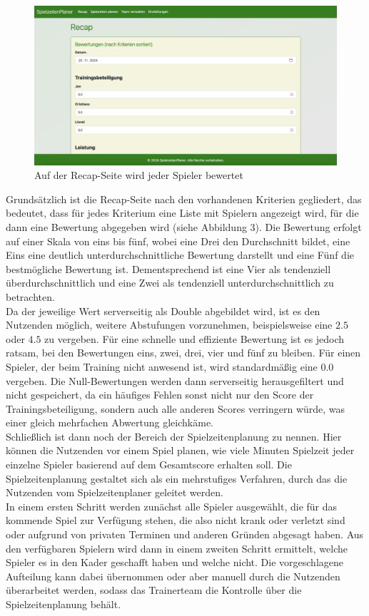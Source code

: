 \begin{figure}[h]
  \centering
  \includegraphics[width=\textwidth]{screenshots/recap.png}
  \caption{Auf der Recap-Seite wird jeder Spieler bewertet}
  \label{fig:recap}
\end{figure}

Grundsätzlich ist die Recap-Seite nach den vorhandenen Kriterien 
gegliedert, das bedeutet, dass für jedes Kriterium eine Liste mit Spielern 
angezeigt wird, für die dann eine Bewertung abgegeben wird (siehe Abbildung 3). Die 
Bewertung erfolgt auf einer Skala von eins bis fünf, wobei eine Drei den Durchschnitt 
bildet, eine Eins eine deutlich unterdurchschnittliche Bewertung darstellt und eine Fünf 
die bestmögliche Bewertung ist. Dementsprechend ist eine Vier als tendenziell 
überdurchschnittlich und eine Zwei als tendenziell unterdurchschnittlich zu 
betrachten. \\ 
Da der jeweilige Wert serverseitig als Double abgebildet wird, ist es den Nutzenden 
möglich, weitere Abstufungen vorzunehmen, beispielsweise eine $ 2.5 $ oder 
$ 4.5 $ zu vergeben. Für eine schnelle und effiziente Bewertung ist es jedoch 
ratsam, bei den Bewertungen eins, zwei, drei, vier und fünf zu bleiben. Für einen 
Spieler, der beim Training nicht anwesend ist, wird standardmäßig eine $ 0.0 $ 
vergeben. Die Null-Bewertungen werden dann serverseitig herausgefiltert und 
nicht gespeichert, da ein häufiges Fehlen sonst nicht nur den Score der 
Trainingsbeteiligung, sondern auch alle anderen Scores verringern würde, was einer 
gleich mehrfachen Abwertung gleichkäme. \\ 
Schließlich ist dann noch der Bereich der Spielzeitenplanung zu nennen. Hier können 
die Nutzenden vor einem Spiel planen, wie viele Minuten Spielzeit jeder einzelne 
Spieler basierend auf dem Gesamtscore erhalten soll. Die Spielzeitenplanung 
gestaltet sich als ein mehrstufiges Verfahren, durch das die Nutzenden vom 
Spielzeitenplaner geleitet werden. \\ 
In einem ersten Schritt werden zunächst alle Spieler ausgewählt, die für das 
kommende Spiel zur Verfügung stehen, die also nicht krank oder verletzt sind oder 
aufgrund von privaten Terminen und anderen Gründen abgesagt haben. Aus den 
verfügbaren Spielern wird dann in einem zweiten Schritt ermittelt, welche Spieler 
es in den Kader geschafft haben und welche nicht. Die vorgeschlagene Aufteilung 
kann dabei übernommen oder aber manuell durch die Nutzenden überarbeitet werden, 
sodass das Trainerteam die Kontrolle über die Spielzeitenplanung behält. \\ 

